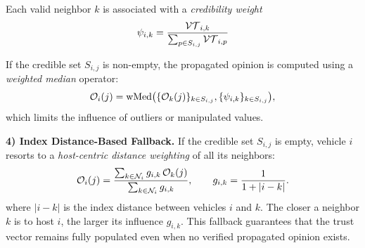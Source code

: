 Each valid neighbor $k$ is associated with a \emph{credibility weight} 
\begin{equation}
\psi_{i,k} = \frac{\mathcal{VT}_{i,k}}{\sum_{p \in S_{i,j}} \mathcal{VT}_{i,p}}
\label{eq:weight}
\end{equation}

If the credible set $S_{i,j}$ is non-empty, the propagated opinion is computed 
using a \emph{weighted median} operator:
\begin{equation}
\mathcal{O}_i(j) = \operatorname{wMed}
\bigl(
\{ \mathcal{O}_k(j) \}_{k\in S_{i,j}},
\{ \psi_{i,k} \}_{k\in S_{i,j}}
\bigr),
\label{eq:weighted_median}
\end{equation}
which limits the influence of outliers or manipulated values.

\vspace{1ex}
\noindent\textbf{4) Index Distance-Based Fallback.}
If the credible set $S_{i,j}$ is empty, 
vehicle $i$ resorts to a \emph{host-centric distance weighting} of all its neighbors:
\begin{equation}
\mathcal{O}_i(j) =
\frac{\sum_{k\in\mathcal{N}_i} g_{i,k} \, \mathcal{O}_k(j)}{\sum_{k\in\mathcal{N}_i} g_{i,k}},
\qquad
g_{i,k} = 
\frac{1}
{1 + |i - k|} .
\label{eq:distance}
\end{equation}
where $|i - k|$ is the index distance between vehicles $i$ and $k$.
The closer a neighbor $k$ is to host $i$, the larger its influence $g_{i,k}$.
This fallback guarantees that the trust vector remains fully populated even when 
no verified propagated opinion exists.


